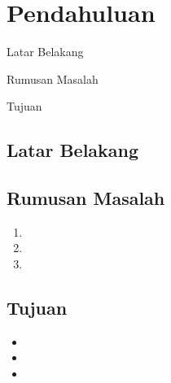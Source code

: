 \subjudul{\lipsum[6][1]}
\chapter{Pendahuluan}

\begin{dibabini}
  \item Latar Belakang
  \item Rumusan Masalah
  \item Tujuan
\end{dibabini}

\section{Latar Belakang}
\lipsum[1-2]

\section{Rumusan Masalah}
\lipsum[3][1-3]
\begin{enumerate}
  \item \lipsum[4][1]
  \item \lipsum[4][2]
  \item \lipsum[4][3]
\end{enumerate}

\section{Tujuan}
\lipsum[5][1-3]
\begin{itemize}
  \item \lipsum[6][1]
  \item \lipsum[6][2]
  \item \lipsum[6][3]
\end{itemize}
